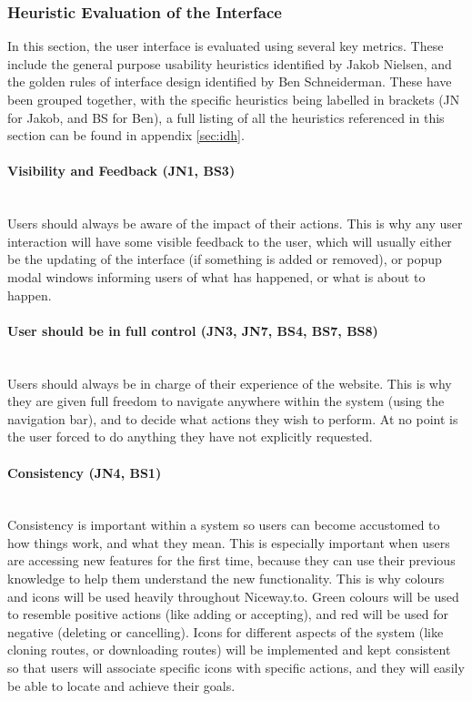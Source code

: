 \subsubsection{Heuristic Evaluation of the Interface}
In this section, the user interface is evaluated using several key metrics. These include the general purpose usability heuristics identified by Jakob Nielsen\cite{nielsen199510}, and the golden rules of interface design identified by Ben Schneiderman\cite{shneiderman2005designing}. These have been grouped together, with the specific heuristics being labelled in brackets (JN for Jakob, and BS for Ben), a full listing of all the heuristics referenced in this section can be found in appendix \ref{sec:idh}.

\newpage 
\paragraph{Visibility and Feedback (JN1, BS3)}\ \\
Users should always be aware of the impact of their actions. This is why any user interaction will have some visible feedback to the user, which will usually either be the updating of the interface (if something is added or removed), or popup modal windows informing users of what has happened, or what is about to happen.

\paragraph{User should be in full control (JN3, JN7, BS4, BS7, BS8)}\ \\
Users should always be in charge of their experience of the website. This is why they are given full freedom to navigate anywhere within the system (using the navigation bar), and to decide what actions they wish to perform. At no point is the user forced to do anything they have not explicitly requested.

\paragraph{Consistency (JN4, BS1)}\ \\
Consistency is important within a system so users can become accustomed to how things work, and what they mean. This is especially important when users are accessing new features for the first time, because they can use their previous knowledge to help them understand the new functionality. This is why colours and icons will be used heavily throughout Niceway.to. Green colours will be used to resemble positive actions (like adding or accepting), and red will be used for negative (deleting or cancelling). Icons for different aspects of the system (like cloning routes, or downloading routes) will be implemented and kept consistent so that users will associate specific icons with specific actions, and they will easily be able to locate and achieve their goals.


